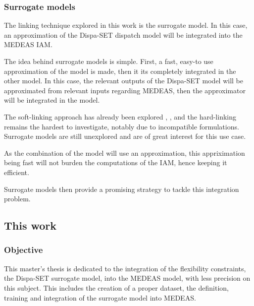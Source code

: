 \subsubsection{Surrogate models}

The linking technique explored in this work is the surrogate model. In this case, an approximation of the Dispa-SET dispatch model will be integrated into the MEDEAS IAM. 

The idea behind surrogate models is simple. First, a fast, easy-to use approximation of the model is made, then it its completely integrated in the other model. In this case, the relevant outputs of the Dispa-SET model will be approximated from relevant inputs regarding MEDEAS, then the approximator will be integrated in the model.

The soft-linking approach has already been explored \cite{Brinkerink2022-softlink}, \cite{DEane2012-softlink}, and the hard-linking remains the hardest to investigate, notably due to incompatible formulations. Surrogate models are still unexplored and are of great interest for this use case.

As the combination of the model will use an approximation, this appriximation being fast will not burden the computations of the IAM, hence keeping it efficient.

Surrogate models then provide a promising strategy to tackle this integration problem.

\subsection{This work}

\subsubsection{Objective}

This master's thesis is dedicated to the integration of the flexibility constraints, the Dispa-SET surrogate model, into the MEDEAS model, with less precision on this subject. This includes the creation of a proper dataset, the definition, training and integration of the surrogate model into MEDEAS.



